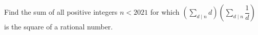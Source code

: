 Find the sum of all positive integers $n<2021$ for which $(\sum_{d\mid n}d)(\sum_{d\mid n}\dfrac{1}{d})$ is the square of a rational number.
